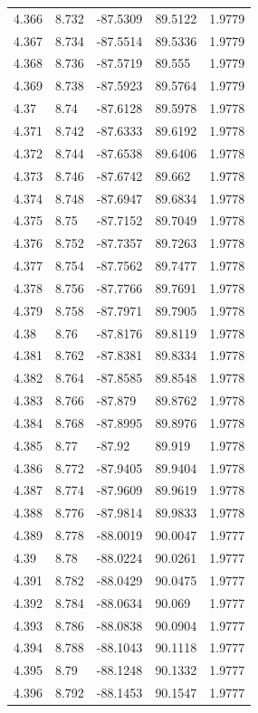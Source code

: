 \begin{tabular}{lllll}
4.366 & 8.732 & -87.5309 & 89.5122 & 1.9779 \\
4.367 & 8.734 & -87.5514 & 89.5336 & 1.9779 \\
4.368 & 8.736 & -87.5719 & 89.555 & 1.9779 \\
4.369 & 8.738 & -87.5923 & 89.5764 & 1.9779 \\
4.37 & 8.74 & -87.6128 & 89.5978 & 1.9778 \\
4.371 & 8.742 & -87.6333 & 89.6192 & 1.9778 \\
4.372 & 8.744 & -87.6538 & 89.6406 & 1.9778 \\
4.373 & 8.746 & -87.6742 & 89.662 & 1.9778 \\
4.374 & 8.748 & -87.6947 & 89.6834 & 1.9778 \\
4.375 & 8.75 & -87.7152 & 89.7049 & 1.9778 \\
4.376 & 8.752 & -87.7357 & 89.7263 & 1.9778 \\
4.377 & 8.754 & -87.7562 & 89.7477 & 1.9778 \\
4.378 & 8.756 & -87.7766 & 89.7691 & 1.9778 \\
4.379 & 8.758 & -87.7971 & 89.7905 & 1.9778 \\
4.38 & 8.76 & -87.8176 & 89.8119 & 1.9778 \\
4.381 & 8.762 & -87.8381 & 89.8334 & 1.9778 \\
4.382 & 8.764 & -87.8585 & 89.8548 & 1.9778 \\
4.383 & 8.766 & -87.879 & 89.8762 & 1.9778 \\
4.384 & 8.768 & -87.8995 & 89.8976 & 1.9778 \\
4.385 & 8.77 & -87.92 & 89.919 & 1.9778 \\
4.386 & 8.772 & -87.9405 & 89.9404 & 1.9778 \\
4.387 & 8.774 & -87.9609 & 89.9619 & 1.9778 \\
4.388 & 8.776 & -87.9814 & 89.9833 & 1.9778 \\
4.389 & 8.778 & -88.0019 & 90.0047 & 1.9777 \\
4.39 & 8.78 & -88.0224 & 90.0261 & 1.9777 \\
4.391 & 8.782 & -88.0429 & 90.0475 & 1.9777 \\
4.392 & 8.784 & -88.0634 & 90.069 & 1.9777 \\
4.393 & 8.786 & -88.0838 & 90.0904 & 1.9777 \\
4.394 & 8.788 & -88.1043 & 90.1118 & 1.9777 \\
4.395 & 8.79 & -88.1248 & 90.1332 & 1.9777 \\
4.396 & 8.792 & -88.1453 & 90.1547 & 1.9777 \\

\end{tabular}
